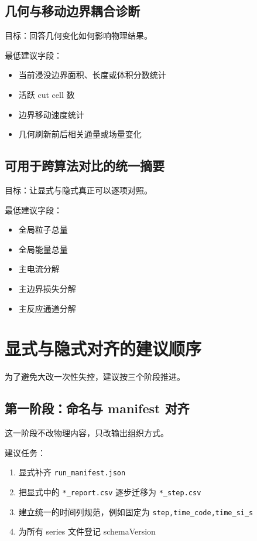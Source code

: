 \documentclass[11pt,a4paper]{ctexart}
\newcommand{\code}[1]{\texttt{#1}}
\newcommand{\file}[1]{\texttt{#1}}
\begin{document}
\subsection{几何与移动边界耦合诊断}

目标：回答几何变化如何影响物理结果。

最低建议字段：

\begin{itemize}
  \item 当前浸没边界面积、长度或体积分数统计
  \item 活跃 cut cell 数
  \item 边界移动速度统计
  \item 几何刷新前后相关通量或场量变化
\end{itemize}

\subsection{可用于跨算法对比的统一摘要}

目标：让显式与隐式真正可以逐项对照。

最低建议字段：

\begin{itemize}
  \item 全局粒子总量
  \item 全局能量总量
  \item 主电流分解
  \item 主边界损失分解
  \item 主反应通道分解
\end{itemize}

\section{显式与隐式对齐的建议顺序}

为了避免大改一次性失控，建议按三个阶段推进。

\subsection{第一阶段：命名与 manifest 对齐}

这一阶段不改物理内容，只改输出组织方式。

建议任务：

\begin{enumerate}
  \item 显式补齐 \file{run\_manifest.json}
  \item 把显式中的 \code{*\_report.csv} 逐步迁移为 \code{*\_step.csv}
  \item 建立统一的时间列规范，例如固定为 \code{step,time\_code,time\_si\_s}
  \item 为所有 series 文件登记 schemaVersion
\end{enumerate}
\end{document}

